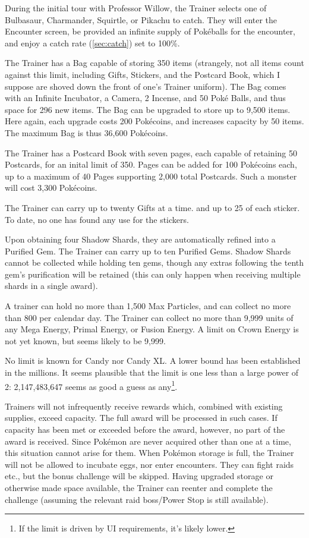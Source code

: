 During the initial tour with Professor Willow, the Trainer selects one of
 Bulbasaur, Charmander, Squirtle, or Pikachu to catch.
They will enter the Encounter screen, be provided an infinite supply of
  Pokéballs for the encounter, and enjoy a catch rate (\autoref{sec:catch}) set to 100\%.

The Trainer has a Bag capable of storing 350 items (strangely, not all items
  count against this limit, including Gifts, Stickers, and the Postcard Book,
  which I suppose are shoved down the front of one's Trainer uniform).
The Bag comes with an Infinite Incubator, a Camera, 2 Incense, and 50 Poké Balls,
  and thus space for 296 new items.
The Bag can be upgraded to store up to 9,500 items.
Here again, each upgrade costs 200 Pokécoins, and increases capacity by 50 items.
The maximum Bag is thus 36,600 Pokécoins.

The Trainer has a Postcard Book with seven pages, each capable of retaining
 50 Postcards, for an inital limit of 350.
Pages can be added for 100 Pokécoins each, up to a maximum of 40 Pages
 supporting 2,000 total Postcards.
Such a monster will cost 3,300 Pokécoins.

The Trainer can carry up to twenty Gifts at a time. and up to 25 of each sticker.
To date, no one has found any use for the stickers.

Upon obtaining four Shadow Shards, they are automatically refined into a Purified Gem.
The Trainer can carry up to ten Purified Gems.
Shadow Shards cannot be collected while holding ten gems, though any extras
 following the tenth gem's purification will be retained (this can only
 happen when receiving multiple shards in a single award).

A trainer can hold no more than 1,500 Max Particles, and can collect no more than 800 per calendar day.
The Trainer can collect no more than 9,999 units of any Mega Energy,
 Primal Energy, or Fusion Energy.
A limit on Crown Energy is not yet known, but seems likely to be 9,999.

No limit is known for Candy nor Candy XL.
A lower bound has been established in the millions.
It seems plausible that the limit is one less than a large power of 2:
  2,147,483,647 seems as good a guess as any\footnote{If the limit is driven by UI requirements, it's likely lower.}.

Trainers will not infrequently receive rewards which, combined with existing supplies, exceed capacity.
The full award will be processed in such cases.
If capacity has been met or exceeded before the award, however, no part of the award is received.
Since Pokémon are never acquired other than one at a time, this situation cannot
 arise for them.
When Pokémon storage is full, the Trainer will not be allowed to incubate eggs,
 nor enter encounters.
They can fight raids etc., but the bonus challenge will be skipped.
Having upgraded storage or otherwise made space available, the Trainer can
 reenter and complete the challenge (assuming the relevant raid boss/Power Stop is
 still available).

